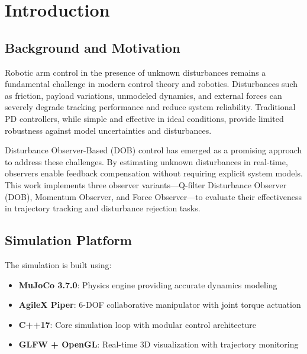 \section{Introduction}

    \subsection{Background and Motivation}
        Robotic arm control in the presence of unknown disturbances remains a fundamental challenge in modern control theory and robotics. 
        Disturbances such as friction, payload variations, unmodeled dynamics, and external forces can severely degrade tracking performance 
        and reduce system reliability. Traditional PD controllers, while simple and effective in ideal conditions, provide limited robustness 
        against model uncertainties and disturbances.

        Disturbance Observer-Based (DOB) control has emerged as a promising approach to address these challenges. By estimating unknown 
        disturbances in real-time, observers enable feedback compensation without requiring explicit system models. This work implements 
        three observer variants---Q-filter Disturbance Observer (DOB), Momentum Observer, and Force Observer---to evaluate their effectiveness 
        in trajectory tracking and disturbance rejection tasks.

    \subsection{Simulation Platform}
        The simulation is built using:\vspace{-4pt}
        \begin{itemize}
            \item \textbf{MuJoCo 3.7.0}: Physics engine providing accurate dynamics modeling
            \item \textbf{AgileX Piper}: 6-DOF collaborative manipulator with joint torque actuation
            \item \textbf{C++17}: Core simulation loop with modular control architecture
            \item \textbf{GLFW + OpenGL}: Real-time 3D visualization with trajectory monitoring
        \end{itemize}

